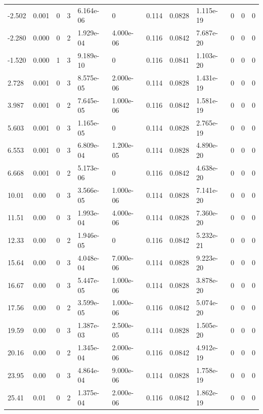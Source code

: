 \documentclass[preview]{standalone}
\begin{document}
{{\begin{tabular}{L{1.2cm}C{1.2cm} C{0.3cm}C{0.5cm} C{1.4cm}C{1.4cm} C{1.4cm}C{1.4cm} C{1.6cm}C{1.6cm} C{1.6cm}C{1.6cm}}
  -2.502  &  0.001  & 0     &  3 &  6.164e-06  & 0  &  0.114&   0.0828& 1.115e-19 & 0   &  0 & 0  \\ 
  -2.280  &  0.000  & 0     &  2 &  1.929e-04  & 4.000e-06  &  0.116&   0.0842& 7.687e-20 & 0   &  0 & 0  \\ 
  -1.520  &  0.000  & 1     &  3 &  9.189e-10  & 0  &  0.116&   0.0841& 1.103e-20 & 0   &  0 & 0  \\ 
  2.728  &  0.001  & 0     &  3 &  8.575e-05  & 2.000e-06  &  0.114&   0.0828& 1.431e-19 & 0   &  0 & 0  \\ 
  3.987  &  0.001  & 0     &  2 &  7.645e-05  & 1.000e-06  &  0.116&   0.0842& 1.581e-19 & 0   &  0 & 0  \\ 
  5.603  &  0.001  & 0     &  3 &  1.165e-05  & 0  &  0.114&   0.0828& 2.765e-19 & 0   &  0 & 0  \\ 
  6.553  &  0.001  & 0     &  3 &  6.809e-04  & 1.200e-05  &  0.114&   0.0828& 4.890e-20 & 0   &  0 & 0  \\ 
  6.668  &  0.001  & 0     &  2 &  5.173e-06  & 0  &  0.116&   0.0842& 4.638e-20 & 0   &  0 & 0  \\ 
  10.01  &  0.00  & 0     &  3 &  3.566e-05  & 1.000e-06  &  0.114&   0.0828& 7.141e-20 & 0   &  0 & 0  \\ 
  11.51  &  0.00  & 0     &  3 &  1.993e-04  & 4.000e-06  &  0.114&   0.0828& 7.360e-20 & 0   &  0 & 0  \\ 
  12.33  &  0.00  & 0     &  2 &  1.946e-05  & 0  &  0.116&   0.0842& 5.232e-21 & 0   &  0 & 0  \\ 
  15.64  &  0.00  & 0     &  3 &  4.048e-04  & 7.000e-06  &  0.114&   0.0828& 9.223e-20 & 0   &  0 & 0  \\ 
  16.67  &  0.00  & 0     &  3 &  5.447e-05  & 1.000e-06  &  0.114&   0.0828& 3.878e-20 & 0   &  0 & 0  \\ 
  17.56  &  0.00  & 0     &  2 &  3.599e-05  & 1.000e-06  &  0.116&   0.0842& 5.074e-20 & 0   &  0 & 0  \\ 
  19.59  &  0.00  & 0     &  3 &  1.387e-03  & 2.500e-05  &  0.114&   0.0828& 1.505e-20 & 0   &  0 & 0  \\ 
  20.16  &  0.00  & 0     &  2 &  1.345e-04  & 2.000e-06  &  0.116&   0.0842& 4.912e-19 & 0   &  0 & 0  \\ 
  23.95  &  0.00  & 0     &  3 &  4.864e-04  & 9.000e-06  &  0.114&   0.0828& 1.758e-19 & 0   &  0 & 0  \\ 
  25.41  &  0.01  & 0     &  2 &  1.375e-04  & 2.000e-06  &  0.116&   0.0842& 1.862e-19 & 0   &  0 & 0  \\ 

\end{tabular}}}
\end{document}
